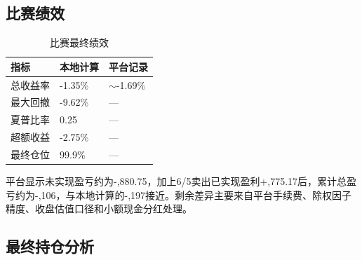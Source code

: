 \documentclass[10pt,a4paper]{ctexart}
\begin{document}
\subsection{比赛绩效}

\begin{table}[htbp]
    \centering
    \caption{比赛最终绩效}
    \begin{tabular}{lll}
        \toprule
        指标 & 本地计算 & 平台记录 \\
        \midrule
        总收益率 & -1.35\% & $\sim$-1.69\% \\
        最大回撤 & -9.62\% & --- \\
        夏普比率 & 0.25 & --- \\
        超额收益 & -2.75\% & --- \\
        最终仓位 & 99.9\% & --- \\
        \bottomrule
    \end{tabular}
\end{table}

平台显示未实现盈亏约为-,880.75，加上6/5卖出已实现盈利+,775.17后，累计总盈亏约为-,106，与本地计算的-,197接近。剩余差异主要来自平台手续费、除权因子精度、收盘估值口径和小额现金分红处理。

\subsection{最终持仓分析}
\end{document}
